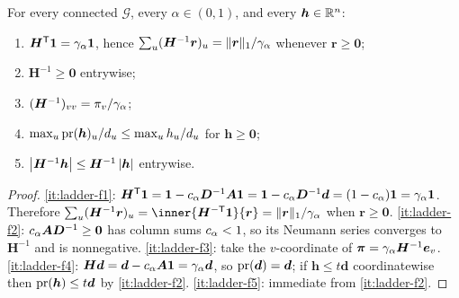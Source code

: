 \begin{lemma}
\label{lem:ladder-facts}
For every connected $\mathcal{G}$, every $\alpha\in(0,1)$, and every
$\bm{h}\in\mathbb{R}^{n}$:
\begin{enumerate}[label=\textup{(F\arabic*)},leftmargin=3em]
    \item\label{it:ladder-f1}
        $\bm{H}^{\mathsf{T}}\mathbf{1}=\gamma_{\alpha}\mathbf{1}$, hence
        $\sum_u(\bm{H}^{-1}\bm{r})_u
        =\lVert\bm{r}\rVert_1/\gamma_{\alpha}$ whenever $\bm{r}\ge\bm{0}$;
    \item\label{it:ladder-f2}
        $\bm{H}^{-1}\ge\bm{0}$ entrywise;
    \item\label{it:ladder-f3}
        $(\bm{H}^{-1})_{vv}=\pi_v/\gamma_{\alpha}$;
    \item\label{it:ladder-f4}
        $\max_u\operatorname{pr}(\bm{h})_u/d_u\le\max_u h_u/d_u$ for
        $\bm{h}\ge\bm{0}$;
    \item\label{it:ladder-f5}
        $\left\lvert \bm{H}^{-1}\bm{h} \right\rvert
        \le\bm{H}^{-1}\left\lvert \bm{h} \right\rvert$ entrywise.
\end{enumerate}
\end{lemma}

\begin{proof}
\ref{it:ladder-f1}:
$\bm{H}^{\mathsf{T}}\mathbf{1}
=\mathbf{1}-c_{\alpha}\bm{D}^{-1}\bm{A}\mathbf{1}
=\mathbf{1}-c_{\alpha}\bm{D}^{-1}\bm{d}
=(1-c_{\alpha})\mathbf{1}=\gamma_{\alpha}\mathbf{1}$. Therefore
$\sum_u(\bm{H}^{-1}\bm{r})_u
=\inner{\bm{H}^{-\trans}\one}{\bm{r}}
=\norm{\bm{r}}_1/\galpha$ when $\bm{r}\ge\bm{0}$.
\ref{it:ladder-f2}: $c_{\alpha}\bm{A}\bm{D}^{-1}\ge\bm{0}$ has column sums
$c_{\alpha}<1$, so its Neumann series converges to $\bm{H}^{-1}$ and is
nonnegative.
\ref{it:ladder-f3}: take the $v$-coordinate of
$\bm{\pi}=\gamma_{\alpha}\bm{H}^{-1}\bm{e}_v$.
\ref{it:ladder-f4}:
$\bm{H}\bm{d}=\bm{d}-c_{\alpha}\bm{A}\mathbf{1}=\gamma_{\alpha}\bm{d}$, so
$\operatorname{pr}(\bm{d})=\bm{d}$; if $\bm{h}\le t\bm{d}$ coordinatewise then
$\operatorname{pr}(\bm{h})\le t\bm{d}$ by \ref{it:ladder-f2}.
\ref{it:ladder-f5}: immediate from \ref{it:ladder-f2}.
\end{proof}
